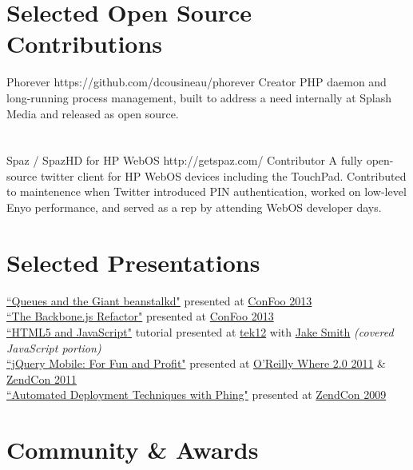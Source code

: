 \documentclass{resume}
\begin{document}
\section{Selected Open Source Contributions}

\project
	{Phorever}
	{https://github.com/dcousineau/phorever}
	{Creator}
	{PHP daemon and long-running process management, built to address a need internally at Splash Media and released as open source.}
\\ \\ \\
\project
	{Spaz / SpazHD for HP WebOS}
	{http://getspaz.com/}
	{Contributor}
	{A fully open-source twitter client for HP WebOS devices including the TouchPad. Contributed to maintenence when Twitter introduced PIN authentication, worked on low-level Enyo performance, and served as a rep by attending WebOS developer days.}

\section{Selected Presentations}

\begin{spacing}{1.25}
\href{https://speakerdeck.com/dcousineau/queues-and-the-giant-beanstalkd}{``Queues and the Giant beanstalkd"} presented at \href{http://confoo.ca/}{ConFoo 2013}\\
\href{https://speakerdeck.com/dcousineau/the-backbone-dot-js-refactor}{``The Backbone.js Refactor"} presented at \href{http://confoo.ca/}{ConFoo 2013}\\
\href{https://speakerdeck.com/u/dcousineau/p/html5-and-javascript-part-deux-javascript}{``HTML5 and JavaScript"} tutorial presented at \href{http://tek12.phparch.com/talks/#HTML5-and-Javascript-for-the-PHP-Developer}{tek12} with \href{http://jakefolio.com/}{Jake Smith} \emph{(covered JavaScript portion)}
\\
\href{http://www.slideshare.net/eljefe/jquery-mobile-for-fun-and-profit}{``jQuery Mobile: For Fun and Profit"} presented at \href{http://whereconf.com/where2011/public/schedule/speaker/110352}{O'Reilly Where 2.0 2011} \& \href{http://zendcon.com/2011/speaker/#4054}{ZendCon 2011}
\\
\href{http://www.slideshare.net/eljefe/automated-deployment-with-phing}{``Automated Deployment Techniques with Phing"} presented at \href{http://zendcon.com/2009/speakers#4054}{ZendCon 2009}
\end{spacing}

\section{Community \& Awards}
\end{document}
